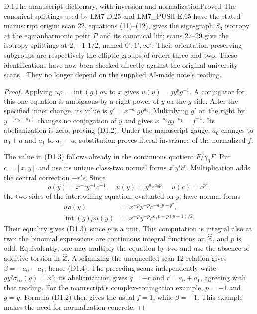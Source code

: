 \begin{statement}{D.1}{The manuscript dictionary, with inversion and normalization}{Proved}
The canonical splittings used by LM7 D.25
and LM7\_PUSH E.65 have the stated manuscript
origin: scan 22, equations (11)--(12), gives
the sign-graph $S_3$ isotropy at the
equianharmonic point $P$ and its canonical
lift; scans 27--29 give the isotropy splittings
at $2,-1,1/2$, named $0',1',\infty'$.
Their orientation-preserving subgroups are
respectively the elliptic groups of orders
three and two. These identifications have
now been checked directly against the
original university scans
\citep[scans 7--12, 22, 27--29]{RootGrothendieckCote145}.
They no longer depend on the supplied
AI-made note's reading.
\end{statement}
\begin{proof}
Applying $u\rho=\operatorname{int}(g)\rho u$
to $x$ gives $u(y)=g y^p g^{-1}$.
A conjugator for this one equation is
ambiguous by a right power of $y$ on the
$g$ side. After the specified inner change,
its value is $g'=x^{-a_0}g y^{a_0}$.
Multiplying $g'$ on the right by
$y^{-(a_0+a_1)}$ changes no conjugation
of $y$ and gives $x^{-a_0}g y^{-a_1}=f^{-1}$.
Its abelianization is zero, proving
(D1.2). Under the manuscript gauge,
$a_0$ changes to $a_0+a$ and $a_1$ to
$a_1-a$; substitution proves literal
invariance of the normalized $f$.

The value in (D1.3) follows already in
the continuous quotient $F/\gamma_3F$.
Put $c=[x,y]$ and use its unique class-two
normal forms $x^r y^s c^t$. Multiplication
adds the central correction $-r's$.
Since
\[
 \rho(y)=x^{-1}y^{-1}c^{-1},\quad
 u(y)=y^p c^{a_0p},\quad u(c)=c^{p^2},
\]
the two sides of the intertwining equation,
evaluated on $y$, have normal forms
\[
 \begin{aligned}
 u\rho(y)&=x^{-p}y^{-p}c^{-a_0p-p^2},\\
 \operatorname{int}(g)\rho u(y)
   &=x^{-p}y^{-p}c^{a_1p-p(p+1)/2}.
 \end{aligned}
\]
Their equality gives (D1.3), since $p$
is a unit. This computation is integral
also at two: the binomial expressions are
continuous integral functions on
$\widehat{\mathbb Z}$, and $p$ is odd. Equivalently,
one may multiply the equation by two
and use the absence of additive torsion
in $\widehat{\mathbb Z}$.
Abelianizing the uncancelled scan-12
relation gives $\beta=-a_0-a_1$, hence
(D1.4). The preceding scans independently
write $g y^q\sigma_\infty(g)=x^r$;
its abelianization gives $q=-r$ and
$r=a_0+a_1$, agreeing with that reading.
For the manuscript's complex-conjugation
example, $p=-1$ and $g=y$. Formula (D1.2)
then gives the usual $f=1$, while
$\beta=-1$. This example makes the
need for normalization concrete.


\end{proof}
